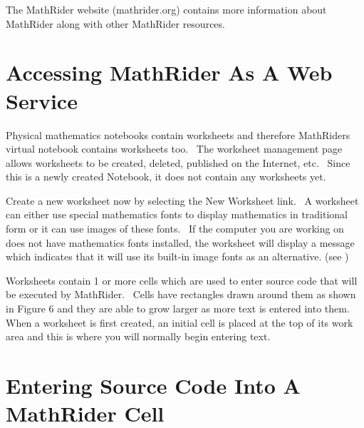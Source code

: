 \documentclass[12pt,twoside]{book}
\begin{document}
\bigskip

The MathRider website (mathrider.org) contains more information about MathRider along with other MathRider resources.

\section[Accessing MathRider As A Web Service]{Accessing MathRider As A Web Service}

\bigskip


\bigskip


\bigskip


\bigskip


\bigskip


\bigskip

Physical mathematics notebooks contain worksheets and therefore MathRider{\textquotesingle}s virtual notebook contains worksheets too. \ The worksheet management page allows worksheets to be created, deleted, published on the Internet, etc. \ Since this is a newly created Notebook, it does not contain any worksheets yet. \  

\bigskip

Create a new worksheet now by selecting the New Worksheet link. \ A worksheet can either use special mathematics fonts to display mathematics in traditional form or it can use images of these fonts. \ If the computer you are working on does not have mathematics fonts installed, the worksheet will display a message which indicates that it will use its built{}-in image fonts as an alternative. (see )  

\bigskip


\bigskip


\bigskip


\bigskip


\bigskip


\bigskip

Worksheets contain 1 or more cells which are used to enter source code that will be executed by MathRider. \ Cells have rectangles drawn around them as shown in Figure 6 and they are able to grow larger as more text is entered into them. When a worksheet is first created, an initial cell is placed at the top of its work area and this is where you will normally begin entering text.

\section[Entering Source Code Into A MathRider Cell]{Entering Source Code Into A MathRider Cell}
\end{document}
